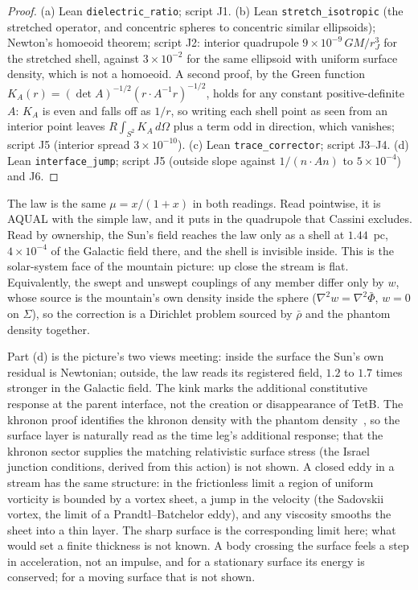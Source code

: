 \documentclass[twocolumn]{iopjournal}
\begin{document}
\begin{proof}
(a) Lean \texttt{dielectric\_ratio}; script J1. (b) Lean
\texttt{stretch\_isotropic} (the stretched operator, and concentric
spheres to concentric similar ellipsoids); Newton's homoeoid theorem;
script J2: interior quadrupole $9\times10^{-9}\,GM/r_J^3$ for the
stretched shell, against $3\times10^{-2}$ for the same ellipsoid with
uniform surface density, which is not a homoeoid. A second proof, by
the Green function $K_A(r) = (\det A)^{-1/2}(r\cdot A^{-1}r)^{-1/2}$,
holds for any constant positive-definite $A$: $K_A$ is even and falls
off as $1/r$, so writing each shell point as seen from an interior point
leaves $R\int_{S^2}K_A\,d\Omega$ plus a term odd in direction, which
vanishes; script J5 (interior spread $3\times10^{-10}$). (c) Lean
\texttt{trace\_corrector}; script J3--J4. (d) Lean
\texttt{interface\_jump}; script J5 (outside slope against
$1/(n\cdot An)$ to $5\times10^{-4}$) and J6.
\end{proof}

The law is the same $\mu = x/(1+x)$ in both readings. Read pointwise,
it is AQUAL with the simple law, and it puts in the quadrupole that
Cassini excludes. Read by ownership, the Sun's field reaches the law
only as a shell at $1.44$~pc, $4\times10^{-4}$ of the Galactic field
there, and the shell is invisible inside. This is the solar-system face
of the mountain picture: up close the stream is flat. Equivalently,
the swept and unswept couplings of any member differ only by $w$,
whose source is the mountain's own density inside the sphere
($\nabla^2 w = \nabla^2\bar\Phi$, $w = 0$ on $\Sigma$), so the
correction is a Dirichlet problem sourced by $\bar\rho$ and the phantom
density together.

Part (d) is the picture's two views meeting: inside the surface the
Sun's own residual is Newtonian; outside, the law reads its registered
field, $1.2$ to $1.7$ times stronger in the Galactic field. The kink
marks the additional constitutive response at the parent interface,
not the creation or disappearance of TetB. The khronon proof identifies
the khronon density with the phantom density~\cite{NelsonKh}, so the
surface layer is naturally read as the time leg's additional response;
that the khronon sector
supplies the matching relativistic surface stress (the Israel junction
conditions, derived from this action) is not shown. A closed eddy in a
stream has the same structure: in the frictionless limit a region of
uniform vorticity is bounded by a vortex sheet, a jump in the velocity
(the Sadovskii vortex, the limit of a Prandtl--Batchelor eddy), and any
viscosity smooths the sheet into a thin layer. The sharp surface is the
corresponding limit here; what would set a finite thickness is not
known. A body crossing the surface feels a step in acceleration, not an
impulse, and for a stationary surface its energy is conserved; for a
moving surface that is not shown.
\end{document}
